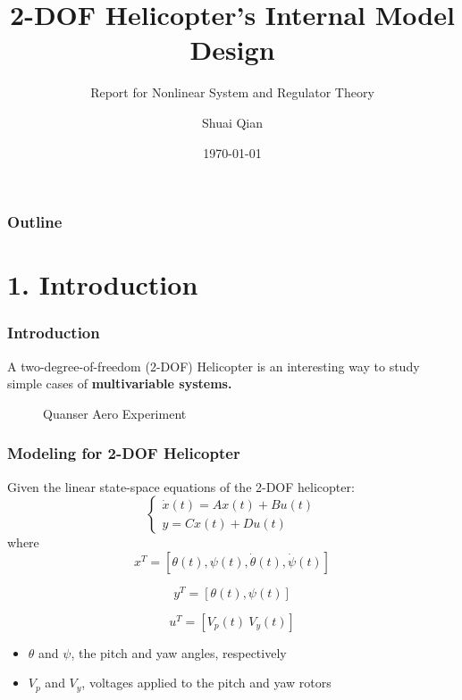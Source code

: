 \documentclass{beamer}
\title{2-DOF Helicopter's Internal Model Design}
\subtitle{Report for Nonlinear System and Regulator Theory}
\author{Shuai Qian}
\institute{School of Automation \\ Nanjing University of Science and Technology \\}
\date{\today}
\begin{document}
\maketitle

\begin{chapterframe}
    \frametitle{Outline}
    \tableofcontents
\end{chapterframe}


\section{\large 1. Introduction}

\begin{frame}[fragile]
	\frametitle{{\color{red} Introduction}}
A two-degree-of-freedom (2-DOF) Helicopter is an interesting way to study simple cases of \textbf{multivariable systems.}
    \begin{figure}[h]
         \centering
         \caption{Quanser Aero Experiment}
         \label{fig:subfig}
    \end{figure}
\end{frame}


\begin{frame}[fragile]
	\frametitle{{\color{red} Modeling for 2-DOF Helicopter}}
Given the linear state-space equations of the 2-DOF helicopter:
\begin{equation}\label{state-space}
    \left\{\begin{matrix}
    \dot{x}(t) = Ax(t)+Bu(t) \\
    y = Cx(t)+Du(t)
    \end{matrix}
    \right.
\end{equation}
where
$$
x^{T} = [\theta(t), \psi(t), \dot{\theta}(t), \dot{\psi}(t)]
$$

$$
y^{T} = [\theta(t), \psi(t)]
$$

$$
u^{T} = [V_{p}(t)~V_{y}(t)]
$$
\begin{itemize}
  \item $\theta$ and $\psi$, the pitch and yaw angles, respectively
  \item $V_{p}$ and $V_{y}$, voltages applied to the pitch and yaw rotors
\end{itemize}
\end{frame}
\end{document}
